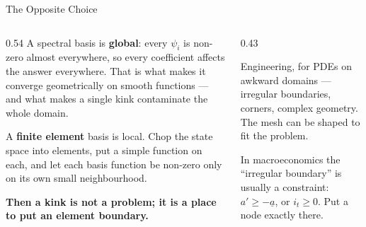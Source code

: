 \begin{frame}{The Opposite Choice}
\begin{columns}[T]
\begin{column}{0.54\textwidth}
\small
A spectral basis is \textbf{global}: every $\psi_i$ is non-zero almost everywhere, so every coefficient affects the answer everywhere. That is what makes it converge geometrically on smooth functions --- and what makes a single kink contaminate the whole domain.
\medskip

A \textbf{finite element} basis is local. Chop the state space into elements, put a simple function on each, and let each basis function be non-zero only on its own small neighbourhood.
\medskip

\textbf{Then a kink is not a problem; it is a place to put an element boundary.}
\end{column}
\begin{column}{0.43\textwidth}
\begin{conceptbox}[title=\textbf{Where FEM comes from}]\small
Engineering, for PDEs on awkward domains --- irregular boundaries, corners, complex geometry. The mesh can be shaped to fit the problem.
\end{conceptbox}
\medskip
\begin{examplebox}\footnotesize
In macroeconomics the ``irregular boundary'' is usually a constraint: $a'\ge-\underline{a}$, or $i_t\ge0$. Put a node exactly there.
\end{examplebox}
\end{column}
\end{columns}
\vspace{1mm}
\end{frame}

